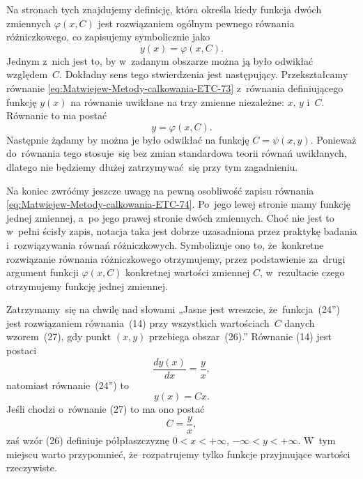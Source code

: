 \documentclass[a4paper,11pt]{article}
\numberwithin{equation}{section}
\begin{document}
\noindent
{} Na stronach tych znajdujemy definicję, która określa kiedy
funkcja dwóch zmiennych $\varphi( x, C )$ jest rozwiązaniem ogólnym pewnego
równania różniczkowego, co zapisujemy symbolicznie jako
\begin{equation}
  \label{eq:Matwiejew-Metody-calkowania-ETC-74}
  y( x ) = \varphi( x, C ).
\end{equation}
Jednym z~nich jest to, by w~zadanym obszarze można ją było odwikłać
względem~$C$. Dokładny sens tego stwierdzenia jest następujący.
Przekształcamy równanie \eqref{eq:Matwiejew-Metody-calkowania-ETC-73}
z~równania definiującego funkcję $y( x )$ na równanie uwikłane na trzy
zmienne niezależne: $x$, $y$ i~$C$. Równanie to ma postać
\begin{equation}
  \label{eq:Matwiejew-Metody-calkowania-ETC-75}
  y = \varphi( x, C ).
\end{equation}
Następnie żądamy by można je było odwikłać na funkcję $C = \psi( x, y )$.
Ponieważ do~równania tego stosuje~się bez zmian standardowa teorii równań
uwikłanych, dlatego nie będziemy dłużej zatrzymywać~się przy tym
zagadnieniu.

Na koniec zwróćmy jeszcze uwagę na pewną osobliwość zapisu równania
\eqref{eq:Matwiejew-Metody-calkowania-ETC-74}. Po~jego lewej stronie mamy
funkcję jednej zmiennej, a~po jego prawej stronie dwóch zmiennych. Choć nie
jest to w~pełni ścisły zapis, notacja taka jest dobrze uzasadniona
przez praktykę badania i~rozwiązywania równań różniczkowych. Symbolizuje
ono to, że~konkretne rozwiązanie równania różniczkowego otrzymujemy, przez
podstawienie za~drugi argument funkcji $\varphi( x, C )$ konkretnej wartości
zmiennej $C$, w~rezultacie czego otrzymujemy funkcję jednej zmiennej.

\VerSpaceFour





\noindent
{} Zatrzymamy~się na chwilę nad słowami „Jasne jest wreszcie,
że~funkcja~(24'') jest rozwiązaniem równania~(14) przy wszystkich
wartościach~$C$ danych wzorem~(27), gdy punkt $( x, y )$ przebiega
obszar~(26).” Równanie (14) jest postaci
\begin{equation}
  \label{eq:Matwiejew-Metody-calkowania-ETC-76}
  \frac{ d y( x ) }{ d x } = \frac{ y }{ x },
\end{equation}
natomiast równanie~(24'') to
\begin{equation}
  \label{eq:Matwiejew-Metody-calkowania-ETC-77}
  y( x ) = C x.
\end{equation}
Jeśli chodzi o~równanie (27) to ma ono postać
\begin{equation}
  \label{eq:Matwiejew-Metody-calkowania-ETC-78}
  C = \frac{ y }{ x },
\end{equation}
zaś wzór (26) definiuje półpłaszczyznę $0 < x < +\infty$, $-\infty < y < +\infty$.
W~tym miejscu warto przypomnieć, że~rozpatrujemy tylko funkcje przyjmujące
wartości rzeczywiste.
\end{document}
